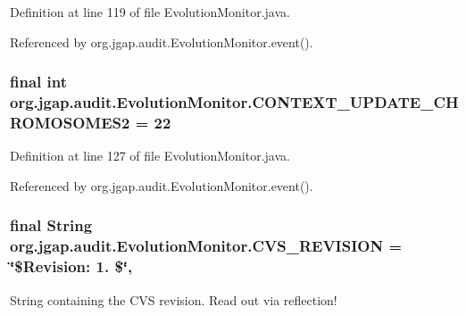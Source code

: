 Definition at line 119 of file Evolution\-Monitor.\-java.



Referenced by org.\-jgap.\-audit.\-Evolution\-Monitor.\-event().

\hypertarget{classorg_1_1jgap_1_1audit_1_1_evolution_monitor_abed0b9acfd069cd676575e6d3922e5ba}{
\subsubsection[{C\-O\-N\-T\-E\-X\-T\-\_\-\-U\-P\-D\-A\-T\-E\-\_\-\-C\-H\-R\-O\-M\-O\-S\-O\-M\-E\-S2}]{\setlength{\rightskip}{0pt plus 5cm}final int org.\-jgap.\-audit.\-Evolution\-Monitor.\-C\-O\-N\-T\-E\-X\-T\-\_\-\-U\-P\-D\-A\-T\-E\-\_\-\-C\-H\-R\-O\-M\-O\-S\-O\-M\-E\-S2 = 22\hspace{0.3cm}{\ttfamily [static]}}}\label{classorg_1_1jgap_1_1audit_1_1_evolution_monitor_abed0b9acfd069cd676575e6d3922e5ba}


Definition at line 127 of file Evolution\-Monitor.\-java.



Referenced by org.\-jgap.\-audit.\-Evolution\-Monitor.\-event().

\hypertarget{classorg_1_1jgap_1_1audit_1_1_evolution_monitor_a8cfabc5fab0da208643c17cf92b79e10}{
\subsubsection[{C\-V\-S\-\_\-\-R\-E\-V\-I\-S\-I\-O\-N}]{\setlength{\rightskip}{0pt plus 5cm}final String org.\-jgap.\-audit.\-Evolution\-Monitor.\-C\-V\-S\-\_\-\-R\-E\-V\-I\-S\-I\-O\-N = \char`\"{}\$Revision\-: 1. \$\char`\"{}\hspace{0.3cm}{\ttfamily [static]}, {\ttfamily [private]}}}\label{classorg_1_1jgap_1_1audit_1_1_evolution_monitor_a8cfabc5fab0da208643c17cf92b79e10}
String containing the C\-V\-S revision. Read out via reflection! 

